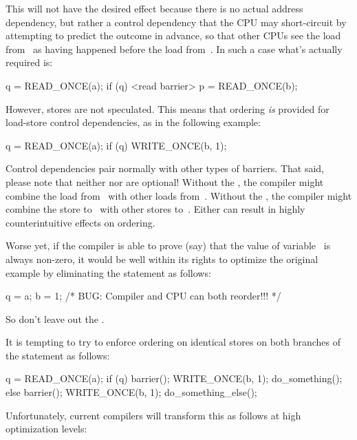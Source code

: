 This will not have the desired effect because there is no actual address
dependency, but rather a control dependency that the CPU may short-circuit
by attempting to predict the outcome in advance, so that other CPUs see
the load from~ as having happened before the load from~.
In such a case what's actually required is:

\begin{VerbatimU}
	q = READ_ONCE(a);
	if (q) {
		<read barrier>
		p = READ_ONCE(b);
	}
\end{VerbatimU}

However, stores are not speculated.
This means that ordering \emph{is} provided for load-store control
dependencies, as in the following example:

\begin{VerbatimU}
	q = READ_ONCE(a);
	if (q) {
		WRITE_ONCE(b, 1);
	}
\end{VerbatimU}

Control dependencies pair normally with other types of barriers.
That said, please note that neither  nor 
are optional!
Without the , the compiler might combine the
load from~ with other loads from~.  Without the ,
the compiler might combine the store to~ with other stores to~.
Either can result in highly counterintuitive effects on ordering.

Worse yet, if the compiler is able to prove (say) that the value of
variable~ is always non-zero, it would be well within its rights
to optimize the original example by eliminating the  statement
as follows:

\begin{VerbatimU}
	q = a;
	b = 1;  /* BUG: Compiler and CPU can both reorder!!! */
\end{VerbatimU}

So don't leave out the .

It is tempting to try to enforce ordering on identical stores on both
branches of the  statement as follows:

\begin{VerbatimU}
	q = READ_ONCE(a);
	if (q) {
		barrier();
		WRITE_ONCE(b, 1);
		do_something();
	} else {
		barrier();
		WRITE_ONCE(b, 1);
		do_something_else();
	}
\end{VerbatimU}

Unfortunately, current compilers will transform this as follows at high
optimization levels:

